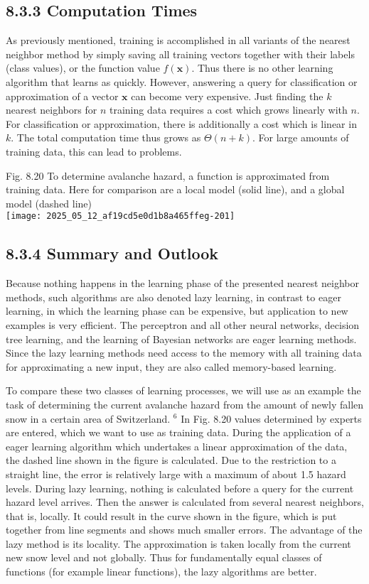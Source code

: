\documentclass[10pt]{article}
\begin{document}
\subsection*{8.3.3 Computation Times}
As previously mentioned, training is accomplished in all variants of the nearest neighbor method by simply saving all training vectors together with their labels (class values), or the function value $f(\boldsymbol{x})$. Thus there is no other learning algorithm that learns as quickly. However, answering a query for classification or approximation of a vector $\boldsymbol{x}$ can become very expensive. Just finding the $k$ nearest neighbors for $n$ training data requires a cost which grows linearly with $n$. For classification or approximation, there is additionally a cost which is linear in $k$. The total computation time thus grows as $\Theta(n+k)$. For large amounts of training data, this can lead to problems.

Fig. 8.20 To determine avalanche hazard, a function is approximated from training data. Here for comparison are a local model (solid line), and a global model (dashed line)\\
\texttt{[image: 2025\_05\_12\_af19cd5e0d1b8a465ffeg-201]}

\subsection*{8.3.4 Summary and Outlook}
Because nothing happens in the learning phase of the presented nearest neighbor methods, such algorithms are also denoted lazy learning, in contrast to eager learning, in which the learning phase can be expensive, but application to new examples is very efficient. The perceptron and all other neural networks, decision tree learning, and the learning of Bayesian networks are eager learning methods. Since the lazy learning methods need access to the memory with all training data for approximating a new input, they are also called memory-based learning.

To compare these two classes of learning processes, we will use as an example the task of determining the current avalanche hazard from the amount of newly fallen snow in a certain area of Switzerland. ${ }^{6}$ In Fig. 8.20 values determined by experts are entered, which we want to use as training data. During the application of a eager learning algorithm which undertakes a linear approximation of the data, the dashed line shown in the figure is calculated. Due to the restriction to a straight line, the error is relatively large with a maximum of about 1.5 hazard levels. During lazy learning, nothing is calculated before a query for the current hazard level arrives. Then the answer is calculated from several nearest neighbors, that is, locally. It could result in the curve shown in the figure, which is put together from line segments and shows much smaller errors. The advantage of the lazy method is its locality. The approximation is taken locally from the current new snow level and not globally. Thus for fundamentally equal classes of functions (for example linear functions), the lazy algorithms are better.
\end{document}
